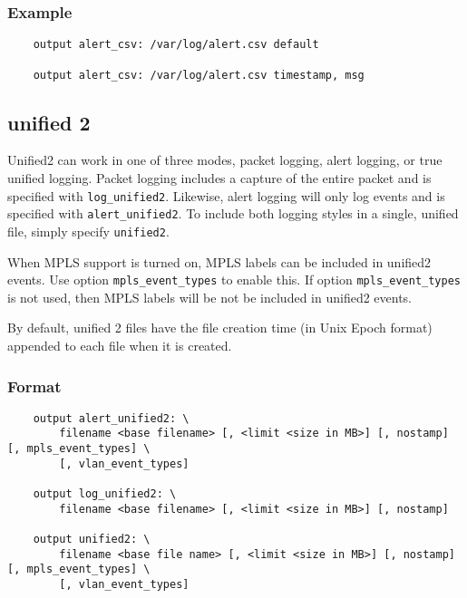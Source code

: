 \documentclass[english]{report}
\newenvironment{note}{
\samepage
    \vspace{10pt}{\textsf{
        {\hspace{7pt}\Huge{$\triangle$\hspace{-12.5pt}{\Large{$^!$}}}}\hspace{5pt}
        {\Large{NOTE}}
    }
    }
   \begin{center}
    \par\vspace{-17pt}

    \begin{lrbox}{\savepar}
    \begin{minipage}[r]{6in}
}
{
    \end{minipage}
    \end{lrbox}
    \fbox{
        \usebox{
            \savepar
	}
    }
    \par\vskip10pt
    \end{center}
}
\newenvironment{note}{
        \begin{rawhtml}
        <p><table border="1"><tr><td><b>
        Note:&nbsp;&nbsp;</b>
        \end{rawhtml}
}{
        \begin{rawhtml}
        </b></td></tr></table></p>
        \end{rawhtml}
}
\begin{document}
\subsubsection{Example}

\begin{verbatim}
    output alert_csv: /var/log/alert.csv default

    output alert_csv: /var/log/alert.csv timestamp, msg
\end{verbatim}

\subsection{unified 2}

Unified2 can work in one of three modes, packet logging, alert logging, or true
unified logging.  Packet logging includes a capture of the entire packet and is
specified with \texttt{log\_unified2}.  Likewise, alert logging will only log
events and is specified with \texttt{alert\_unified2}.  To include both logging
styles in a single, unified file, simply specify \texttt{unified2}.

When MPLS support is turned on, MPLS labels can be included in unified2 events.
Use option \texttt{mpls\_event\_types} to enable this. If option
\texttt{mpls\_event\_types} is not used, then MPLS labels will be not be
included in unified2 events.

\begin{note}

By default, unified 2 files have the file creation time (in Unix Epoch format)
appended to each file when it is created.  

\end{note}

\subsubsection{Format}

\begin{verbatim}
    output alert_unified2: \
        filename <base filename> [, <limit <size in MB>] [, nostamp] [, mpls_event_types] \
        [, vlan_event_types]

    output log_unified2: \
        filename <base filename> [, <limit <size in MB>] [, nostamp]

    output unified2: \
        filename <base file name> [, <limit <size in MB>] [, nostamp] [, mpls_event_types] \
        [, vlan_event_types]
\end{verbatim}
\end{document}
